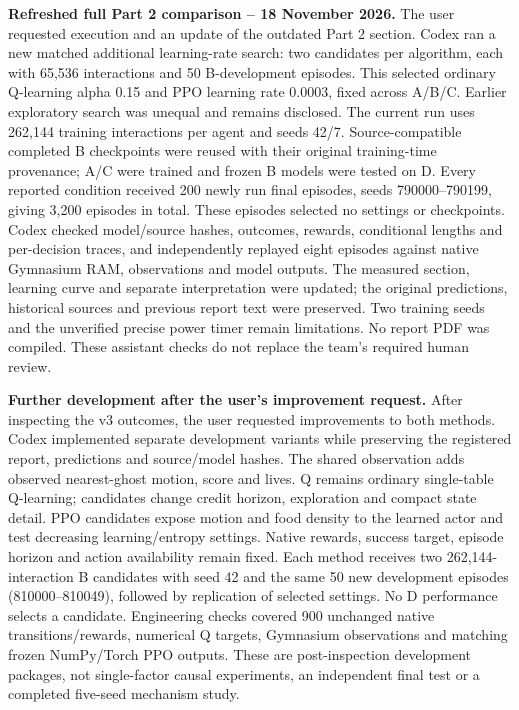 \medskip
\noindent\textbf{Refreshed full Part 2 comparison -- 18 November 2026.}
The user requested execution and an update of the outdated Part 2 section.
Codex ran a new matched additional learning-rate search: two candidates per
algorithm, each with 65,536 interactions and 50 B-development episodes. This
selected ordinary Q-learning alpha 0.15 and PPO learning rate 0.0003, fixed
across A/B/C. Earlier exploratory search was unequal and remains disclosed.
The current run uses 262,144 training interactions per agent and seeds 42/7.
Source-compatible completed B checkpoints were reused with their original
training-time provenance; A/C were trained and frozen B models were tested on D.
Every reported condition received 200 newly run final episodes, seeds
790000--790199, giving 3,200 episodes in total. These episodes selected no
settings or checkpoints. Codex checked model/source hashes, outcomes, rewards,
conditional lengths and per-decision traces, and independently replayed eight
episodes against native Gymnasium RAM, observations and model outputs.
The measured section, learning curve and separate interpretation were updated;
the original predictions, historical sources and previous report text were
preserved. Two training seeds and the unverified precise power timer remain
limitations. No report PDF was compiled. These assistant checks do not replace
the team's required human review.

\medskip
\noindent\textbf{Further development after the user's improvement request.}
After inspecting the v3 outcomes, the user requested improvements to both
methods. Codex implemented separate development variants while preserving
the registered report, predictions and source/model hashes. The shared
observation adds observed nearest-ghost motion, score and lives. Q remains
ordinary single-table Q-learning; candidates change credit horizon,
exploration and compact state detail. PPO candidates expose motion and food
density to the learned actor and test decreasing learning/entropy settings.
Native rewards, success target, episode horizon and action availability remain
fixed. Each method receives two 262,144-interaction B candidates with seed 42
and the same 50 new development episodes (810000--810049), followed by
replication of selected settings. No D performance selects a candidate.
Engineering checks covered 900 unchanged native transitions/rewards, numerical
Q targets, Gymnasium observations and matching frozen NumPy/Torch PPO outputs.
These are post-inspection development packages, not single-factor causal
experiments, an independent final test or a completed five-seed mechanism study.

